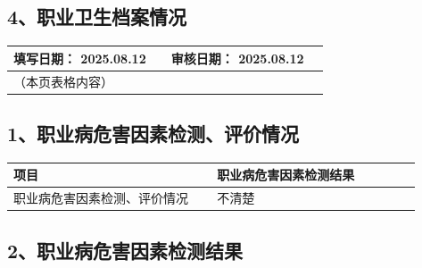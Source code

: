 \documentclass[UTF8,10pt,a4paper,fontset=fandol]{ctexart}
\newcommand{\fieldvalue}[1]{#1}
\newcommand{\handwritten}[1]{#1}
\begin{document}
\subsection*{4、职业卫生档案情况}

\begin{tabular}{|p{0.46\linewidth}|p{0.46\linewidth}|}
\hline
填写日期：%
\fieldvalue{\handwritten{2025.08.12}}
&
审核日期：%
\fieldvalue{\handwritten{2025.08.12}}
\\
\hline
\multicolumn{2}{|p{0.92\linewidth}|}{（本页表格内容）} \\
\hline
\end{tabular}

\subsection*{1、职业病危害因素检测、评价情况}

\begin{tabular}{|p{0.46\linewidth}|p{0.46\linewidth}|}
\hline
项目 & 职业病危害因素检测结果 \\
\hline
职业病危害因素检测、评价情况
&
\fieldvalue{\handwritten{不清楚}}
\\
\hline
\end{tabular}

\subsection*{2、职业病危害因素检测结果}
\end{document}
